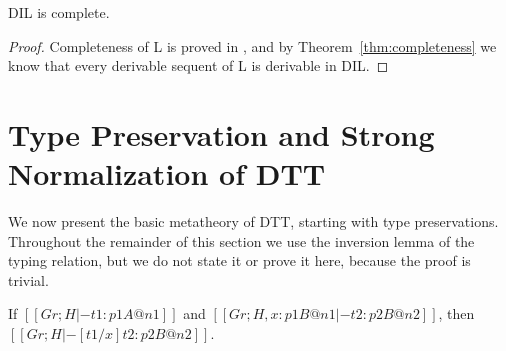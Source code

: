\begin{corollary}[Completeness]
  \label{corollary:completeness}
  DIL is complete.
\end{corollary}
\begin{proof}
  Completeness of L is proved in \cite{Pinto:2009}, and by Theorem~\ref{thm:completeness} we know that
  every derivable sequent of L is derivable in DIL.
\end{proof}

\section{Type Preservation and Strong Normalization of DTT}
\label{sec:dualized_type_theory}
We now present the basic metatheory of DTT, starting with type
preservations. Throughout the remainder of this section we use
the inversion lemma of the typing relation, but we do not state it or
prove it here, because the proof is trivial.
\begin{lemma}
  \label{lemma:substitution_for_typing}
  If $[[Gr ; H |- t1 : p1 A @ n1]]$ and $[[Gr ; H, x : p1 B @ n1 |- t2 : p2 B @ n2]]$, then
  $[[Gr ; H |- [t1/x]t2 : p2 B @ n2]]$.
\end{lemma}
